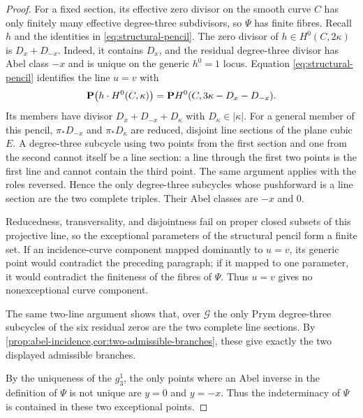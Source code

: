 \begin{proof}
For a fixed section, its effective zero divisor on the smooth curve $C$ has
only finitely many effective degree-three subdivisors, so $\Psi$ has finite
fibres.  Recall $h$ and the identities in
\eqref{eq:structural-pencil}.
The zero divisor of $h\in H^0(C,2\kappa)$ is
$D_x+D_{-x}$.  Indeed, it contains $D_x$, and the residual degree-three
divisor has Abel class $-x$ and is unique on the generic $h^0=1$ locus.
Equation \eqref{eq:structural-pencil} identifies the line $u=v$ with
\[
 \mathbf P\bigl(h\cdot H^0(C,\kappa)\bigr)
 =\mathbf P H^0(C,3\kappa-D_x-D_{-x}).
\]
 Its members have divisor $D_x+D_{-x}+D_\kappa$ with
 $D_\kappa\in|\kappa|$.  For a general member of this pencil,
 $\pi_*D_{-x}$ and $\pi_*D_\kappa$ are reduced, disjoint line sections of the
 plane cubic $E$.  A
 degree-three subcycle using two points from the first section and one from
 the second cannot itself be a line section: a line through the first two
 points is the first line and cannot contain the third point.  The same
 argument applies with the roles reversed.  Hence the only degree-three
 subcycles whose pushforward is a line section are the two complete triples.
 Their Abel classes are $-x$ and $0$.

 Reducedness, transversality, and disjointness fail on proper closed subsets
 of this projective line, so the exceptional parameters of the structural
 pencil form a finite set.  If
 an incidence-curve component mapped dominantly to $u=v$, its generic point
 would contradict the preceding paragraph; if it mapped to one parameter, it
 would contradict the finiteness of the fibres of $\Psi$.  Thus $u=v$ gives no
 nonexceptional curve component.

 The same two-line argument shows that, over
 $\mathscr G$ the only Prym degree-three subcycles of the six residual zeros
are the two complete line sections.  By
\cref{prop:abel-incidence,cor:two-admissible-branches}, these give exactly
the two displayed admissible branches.

By the uniqueness of the $g^1_3$, the only points where an Abel inverse in
the definition of $\Psi$ is not unique are $y=0$ and $y=-x$.  Thus the
indeterminacy of $\Psi$ is contained in these two exceptional points.


\end{proof}
